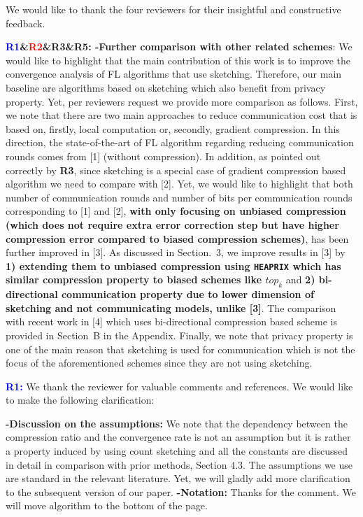 \documentclass{article}
\begin{document}
We would like to thank the four reviewers for their insightful and constructive feedback. 

\textbf{\textcolor{blue}{R1}\&\textcolor{red}{R2}\&\textbf{\color{yellow!50!black}R3}\&\textbf{\textcolor{green!50!black}{R5:}} -Further comparison with other related schemes}: We would like to highlight that the main contribution of this work is to improve the convergence analysis of FL algorithms that use sketching. 
Therefore, our main baseline are algorithms based on sketching which also {benefit from privacy property}. 
Yet, per reviewers request we provide more comparison as follows. 
First, we note that there are two main approaches to reduce communication cost that is based on, firstly, local computation or, secondly, gradient compression. In this direction, the state-of-the-art of FL algorithm regarding reducing communication rounds comes from [1] (without compression). 
In addition, as pointed out correctly by \textbf{\textcolor{yellow!50!black}{R3}}, since sketching is a special case of gradient compression based algorithm we need to compare with [2]. 
Yet, we would like to highlight that both number of communication rounds and number of bits per communication rounds corresponding to [1] and [2], \textbf{with only focusing on unbiased compression (which does not require extra error correction step but have higher compression error compared to biased compression schemes)}, has been further improved in [3]. 
As discussed in Section.~3, we improve results in [3] by \textbf{1)  extending them to unbiased compression using \texttt{HEAPRIX} which has similar compression property to biased schemes like $top_k$} and \textbf{2)  bi-directional communication property due to lower dimension of sketching and not communicating models, unlike [3]}.  
The comparison with recent work in [4] which uses bi-directional compression based scheme is provided in Section~B in the Appendix. 
Finally, we note that privacy property is one of the main reason that sketching is used for communication which is not the focus of the aforementioned schemes since they are not using sketching.



\textbf{\textcolor{blue}{R1:}} We thank the reviewer for valuable comments and references. We would like to make the following clarification:\vspace{-1.5pt} 


\textbf{-Discussion on the assumptions:} We note that the dependency between the compression ratio and the convergence rate is not an assumption but it is rather a property induced by using count sketching and all the constants are discussed in detail in comparison with prior methods, Section 4.3. 
The assumptions we use are standard in the relevant literature. 
Yet, we will gladly add more clarification to the subsequent version of our paper. 
\textbf{-Notation:} Thanks for the comment. We will move algorithm to the bottom of the page.
\end{document}
